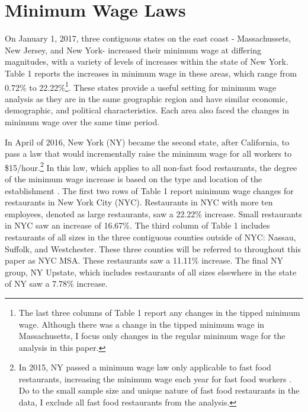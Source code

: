 \documentclass[11pt]{article}
\begin{document}
\section{Minimum Wage Laws}
On January 1, 2017, three contiguous states on the east coast - Massachussets, New Jersey, and New York- increased their minimum wage at differing magnitudes, with a variety of levels of increases within the state of New York. Table 1 reports the increases in minimum wage in these areas, which range from 0.72\% to 22.22\%\footnote{The last three columns of Table 1 report any changes in the tipped minimum wage. Although there was a change in the tipped minimum wage in Massachusetts, I focus only changes in the regular minimum wage for the analysis in this paper.}. These states provide a useful setting for minimum wage analysis as they are in the same geographic region and have similar economic, demographic, and political characteristics. Each area also faced the changes in minimum wage over the same time period. 

In April of 2016, New York (NY) became the second state, after California, to pass a law that would incrementally raise the minimum wage for all workers to \$15/hour.\footnote{In 2015, NY passed a minimum wage law only applicable to fast food restaurants, increasing the minimum wage each year for fast food workers \cite{nyff}. Do to the small sample size and unique nature of fast food restaurants in the data, I exclude all fast food restaurants from the analysis.} In this law, which applies to all non-fast food restaurants, the degree of the minimum wage increase is based on the type and location of the establishment \cite{nybill}. The first two rows of Table 1 report minimum wage changes for restaurants in New York City (NYC). Restaurants in NYC with more ten employees, denoted as large restaurants, saw a 22.22\% increase. Small restaurants in NYC saw an increase of 16.67\%. The third column of Table 1 includes restaurants of all sizes in the three contiguous counties outside of NYC: Nassau, Suffolk, and Westchester. These three counties will be referred to throughout this paper as NYC MSA. These restaurants saw a 11.11\% increase. The final NY group, NY Upstate, which includes restaurants of all sizes elsewhere in the state of NY saw a 7.78\% increase.
\end{document}
